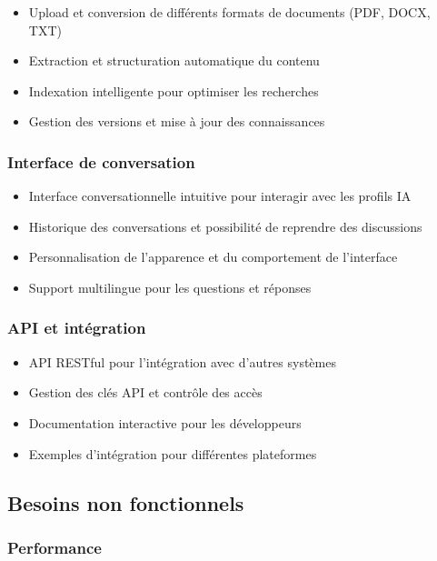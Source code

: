 \begin{itemize}
  \item Upload et conversion de différents formats de documents (PDF, DOCX, TXT)
  \item Extraction et structuration automatique du contenu
  \item Indexation intelligente pour optimiser les recherches
  \item Gestion des versions et mise à jour des connaissances
\end{itemize}

\subsubsection{Interface de conversation}

\begin{itemize}
  \item Interface conversationnelle intuitive pour interagir avec les profils IA
  \item Historique des conversations et possibilité de reprendre des discussions
  \item Personnalisation de l'apparence et du comportement de l'interface
  \item Support multilingue pour les questions et réponses
\end{itemize}

\subsubsection{API et intégration}

\begin{itemize}
  \item API RESTful pour l'intégration avec d'autres systèmes
  \item Gestion des clés API et contrôle des accès
  \item Documentation interactive pour les développeurs
  \item Exemples d'intégration pour différentes plateformes
\end{itemize}

\subsection{Besoins non fonctionnels}

\subsubsection{Performance}

